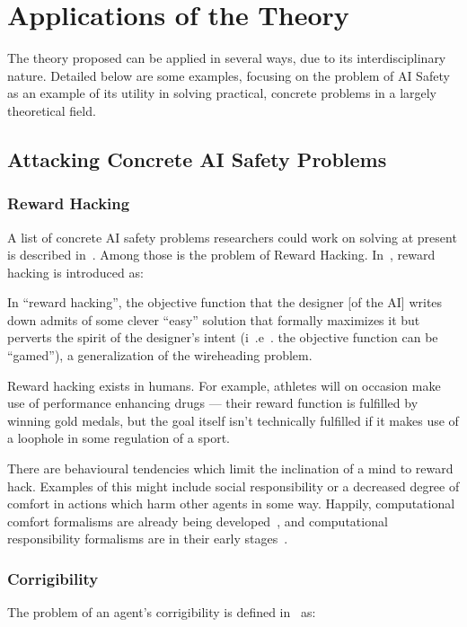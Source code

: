 \section{Applications of the Theory}
The theory proposed can be applied in several ways, due to its interdisciplinary nature. Detailed below are some examples, focusing on the problem of AI Safety as an example of its utility in solving practical, concrete problems in a largely theoretical field.\par

\subsection{Attacking Concrete AI Safety Problems}

\subsubsection{Reward Hacking}
A list of concrete AI safety problems researchers could work on solving at present is described in~\cite{concrete_problems}. Among those is the problem of Reward Hacking. In~\cite{concrete_problems}, reward hacking is introduced as:

\begin{displayquote}
In ``reward hacking'', the objective function that the designer [of the AI] writes down admits of some clever ``easy'' solution that formally maximizes it but perverts the spirit of the designer’s intent (i~.e~. the objective function can be ``gamed''), a generalization of the wireheading problem.
\end{displayquote}

Reward hacking exists in humans. For example, athletes will on occasion make use of performance enhancing drugs --- their reward function is fulfilled by winning gold medals, but the goal itself isn't technically fulfilled if it makes use of a loophole in some regulation of a sport.\par

There are behavioural tendencies which limit the inclination of a mind to reward hack. Examples of this might include social responsibility or a decreased degree of comfort in actions which harm other agents in some way. Happily, computational comfort formalisms are already being developed~\citep{Marsh2011}, and computational responsibility formalisms are in their early stages~\citep{wallis_responsibility}.\par

\subsubsection{Corrigibility}
The problem of an agent's corrigibility is defined in~\cite{corrigibility} as:

